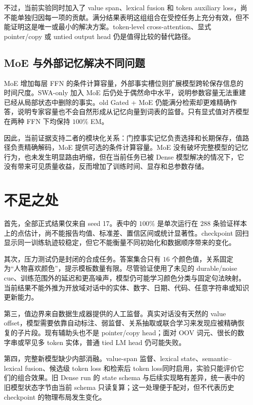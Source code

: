 \documentclass[letterpaper]{article}
\begin{document}
不过，当前实验同时加入了 value span、lexical fusion 和 token auxiliary loss，尚不能单独归因每一项的贡献。满分结果表明这组组合在受控任务上充分有效，但不能证明这是唯一或最小的解决方案。token-level cross-attention、显式 pointer/copy 或 untied output head 仍是值得比较的替代路径。

\subsection{MoE 与外部记忆解决不同问题}

MoE 增加每层 FFN 的条件计算容量，外部事实槽位则扩展模型跨轮保存信息的时间尺度。SWA-only 加入 MoE 后仍处于偶然命中水平，说明参数容量无法重建已经从局部状态中删除的事实。old Gated + MoE 仍能满分检索却更难精确作答，说明专家容量也不会自然形成从记忆向量到词表的监督。只有显式值对齐模型在两种 FFN 下均保持 $100\%$ EM。

因此，当前证据支持二者的模块化关系：门控事实记忆负责选择和长期保存，值路径负责精确解码，MoE 提供可选的条件计算容量。MoE 没有破坏完整模型的记忆行为，也未发生明显路由坍缩，但在当前任务已被 Dense 模型解决的情况下，它没有带来可见质量收益，反而增加了训练时间、显存和总参数存储。

\section{不足之处}

首先，全部正式结果仅来自 seed 17。表中的 $100\%$ 是单次运行在 $288$ 条验证样本上的点估计，尚不能报告均值、标准差、置信区间或统计显著性。checkpoint 回扫显示同一训练轨迹较稳定，但它不能衡量不同初始化和数据顺序带来的变化。

其次，压力测试仍是封闭的合成任务。答案集合只有 $16$ 个颜色值，关系固定为“人物喜欢颜色”，提示模板数量有限。尽管验证使用了未见的 durable/noise cue、训练范围外的延迟和更高噪声，模型仍可能学习颜色分类与固定句法映射。当前结果不能外推为开放域对话中的实体、数字、日期、代码、任意字符串或知识更新能力。

第三，值边界来自数据生成器提供的人工监督。真实对话没有天然的 value offset，模型需要依靠自动标注、弱监督、关系抽取或联合学习来发现应被精确恢复的子片段。现有辅助头也不是 pointer/copy head；面对 OOV 词元、很长的数字串或罕见多 token 实体，普通 tied LM head 仍可能失败。

第四，完整新模型缺少内部消融。value-span 监督、lexical state、semantic--lexical fusion、候选级 token loss 和检索后 token loss同时启用，实验只能评价它们的组合效果。旧 Dense run 的 state schema 与后续实现略有差异，统一表中的旧模型状态字节由当前 schema 只读复算；这一处理便于配对，但不代表历史 checkpoint 的物理布局发生变化。
\end{document}
